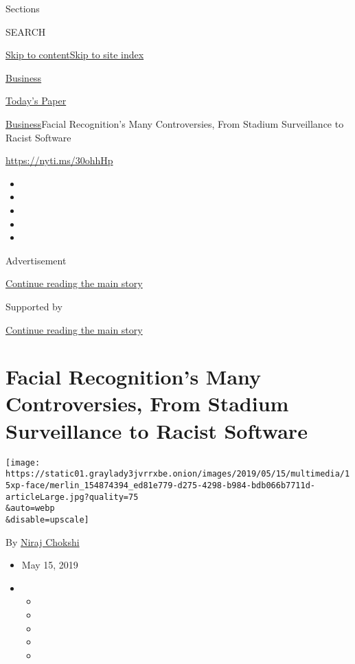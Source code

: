 Sections

SEARCH

\protect\hyperlink{site-content}{Skip to
content}\protect\hyperlink{site-index}{Skip to site index}

\href{https://www.nytimes3xbfgragh.onion/section/business}{Business}

\href{https://myaccount.nytimes3xbfgragh.onion/auth/login?response_type=cookie\&client_id=vi}{}

\href{https://www.nytimes3xbfgragh.onion/section/todayspaper}{Today's
Paper}

\href{/section/business}{Business}\textbar{}Facial Recognition's Many
Controversies, From Stadium Surveillance to Racist Software

\url{https://nyti.ms/30ohhHp}

\begin{itemize}
\item
\item
\item
\item
\item
\end{itemize}

Advertisement

\protect\hyperlink{after-top}{Continue reading the main story}

Supported by

\protect\hyperlink{after-sponsor}{Continue reading the main story}

\hypertarget{facial-recognitions-many-controversies-from-stadium-surveillance-to-racist-software}{%
\section{Facial Recognition's Many Controversies, From Stadium
Surveillance to Racist
Software}\label{facial-recognitions-many-controversies-from-stadium-surveillance-to-racist-software}}

\texttt{[image: https://static01.graylady3jvrrxbe.onion/images/2019/05/15/multimedia/15xp-face/merlin\_154874394\_ed81e779-d275-4298-b984-bdb066b7711d-articleLarge.jpg?quality=75\\\&auto=webp\\\&disable=upscale]}

By \href{https://www.nytimes3xbfgragh.onion/by/niraj-chokshi}{Niraj
Chokshi}

\begin{itemize}
\item
  May 15, 2019
\item
  \begin{itemize}
  \item
  \item
  \item
  \item
  \item
  \end{itemize}
\end{itemize}

